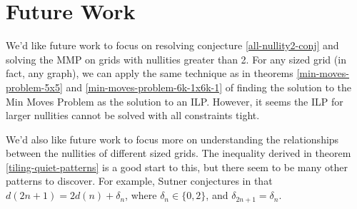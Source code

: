 \documentclass[a4paper]{article}
\begin{document}
	\section{Future Work}
	We'd like future work to focus on resolving conjecture \ref{all-nullity2-conj} and solving the MMP on grids with nullities greater than 2.
	For any sized grid (in fact, any graph), we can apply the same technique as in theorems \ref{min-moves-problem-5x5} and \ref{min-moves-problem-6k-1x6k-1} of finding the solution to the Min Moves Problem as the solution to an ILP.
	However, it seems the ILP for larger nullities cannot be solved with all constraints tight.
	
	We'd also like future work to focus more on understanding the relationships between the nullities of different sized grids.
	The inequality derived in theorem \ref{tiling-quiet-patterns} is a good start to this, but there seem to be many other patterns to discover.
	For example, Sutner conjectures in \cite{Sutner1989} that $d(2n+1) = 2d(n) + \delta_n$, where $\delta_n \in \{0,2\}$, and $\delta_{2n+1} = \delta_n$.

	\newpage
	
	
\end{document}

